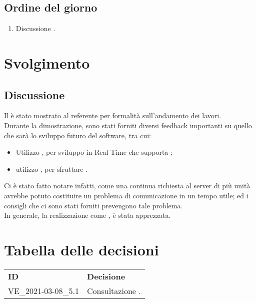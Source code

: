 \documentclass[]{article}
\begin{document}
	\subsection{Ordine del giorno}
	\begin{enumerate}
		\item Discussione .
	\end{enumerate}
	\newpage
	\section{Svolgimento}


	\subsection{Discussione }
	Il  è stato mostrato al referente per formalità sull'andamento dei lavori. \\
	Durante la dimostrazione, sono stati forniti diversi feedback importanti su quello che sarà lo sviluppo futuro del software, tra cui:
	\begin{itemize}
		\item Utilizzo , per sviluppo in Real-Time che supporta ;
		\item utilizzo , per sfruttare .\\
	\end{itemize}

	Ci è stato fatto notare infatti, come una continua richiesta al server di più unità avrebbe potuto costituire un problema di comunicazione in un tempo utile; ed i consigli che ci sono stati forniti prevengono tale problema. \\
	In generale, la realizzazione come , è stata apprezzata.



	\newpage

	\section{Tabella delle decisioni}

	\begin{table} [h!]
		\begin{center}
			\begin{tabular} { m{2cm} m{14cm} }
				\rowcolor{lightgray}
				\textbf{ID} & \textbf{Decisione}\\
				VE\_2021-03-08\_5.1 & Consultazione \glock{Atmosphere}.\\

			\end{tabular}
		\end{center}
	\end{table}
\end{document}
